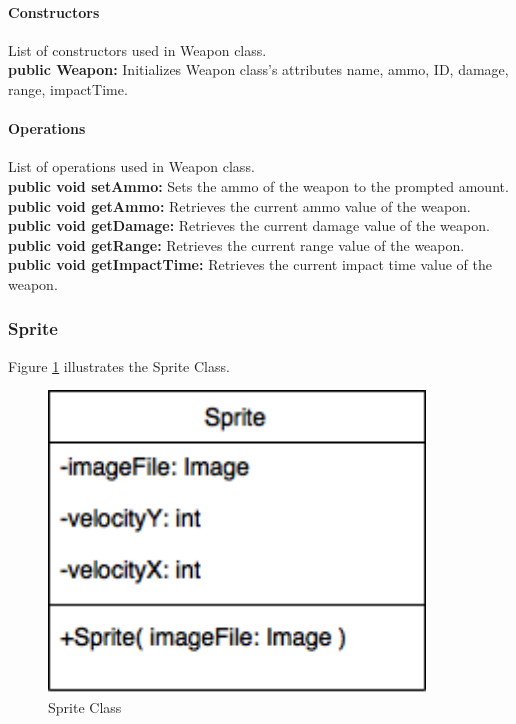 \documentclass[12pt]{article} %
\begin{document}
\paragraph{Constructors \\}
List of constructors used in Weapon class.\\
\textbf{public Weapon:} Initializes Weapon class's attributes name, ammo, ID, damage, range, impactTime.

\paragraph{Operations \\}
List of operations used in Weapon class.\\
\textbf{public void setAmmo:} Sets the ammo of the weapon to the prompted amount. \\
\textbf{public void getAmmo:} Retrieves the current ammo value of the weapon. \\
\textbf{public void getDamage:} Retrieves the current damage value of the weapon. \\
\textbf{public void getRange:} Retrieves the current range value of the weapon. \\
\textbf{public void getImpactTime:} Retrieves the current impact time value of the weapon. 


\subsubsection{Sprite} %

Figure \ref{fig:sprite} illustrates the Sprite Class.
\begin{figure}[h!]
   \centering
   \vspace{10pt}%
   \includegraphics[width=10cm]{sprite.png}
   \caption{Sprite Class}
   \label{fig:sprite}
\end{figure}
\end{document}

